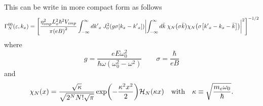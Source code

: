 \noindent
This can be write in more compact form as follows
\begin{equation} \label{5.8}
  \begin{aligned}
    \Gamma^{00}_{N}(\varepsilon,k_x)  =
    \qty[
    \frac { \eta_{imp}^2 L_x^2 \hbar^2 V_{imp}}{\pi\qty(eB)^2}
    \int_{-\infty}^{\infty} d {k'}_x \;
    J_0^2\qty(g\sigma[{k}_x - {k'}_x])
    \qty|
    \int_{-\infty}^{\infty} d\bar{k} \;
    {\chi}_{N}\qty(\sigma\bar{k})
    {\chi}_{N}\qty(\sigma\qty[{k'}_x - {k}_x - \bar{k}])|^2
    ]^{-1/2}
  \end{aligned}
\end{equation}
where
\begin{equation} \label{5.9}
    g = \frac{eE\omega_0^2}{\hbar\omega(\omega_0^2 - \omega^2)} \quad\quad
    \sigma = \frac{\hbar}{eB}
\end{equation}
and
\begin{equation} \label{5.10}
  \chi_N(x) = \frac{\sqrt{\kappa}}{\sqrt{2^{N}N!\sqrt{\pi}}}
  \exp(-\frac{\kappa^2 x^2}{2})
  \mathcal{H}_N\qty(\kappa x) \quad \text{with} \quad
  \kappa \equiv \sqrt{\frac{m_e \omega_0}{\hbar}}.
\end{equation}

